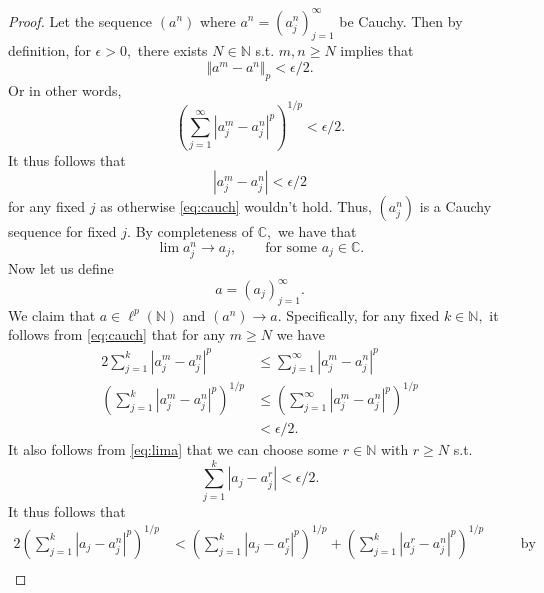 \documentclass[10pt]{article}
\begin{document}
\begin{proof}
    Let the sequence $(a^n)$ where $a^n = (a_j^n)_{j=1}^\infty$ be Cauchy. Then by definition, for $\epsilon > 0,$ there exists $N\in\mathbb{N}$ s.t. $m,n\ge N$ implies that
    \begin{equation*}
        \Vert a^m - a^n \Vert_p < \epsilon/2.
    \end{equation*}
    Or in other words,
    \begin{equation} \label{eq:cauch}
        \left (\sum_{j=1}^{\infty} |a_j^m - a_j^n|^p \right)^{1/p} < \epsilon/2.
    \end{equation}
    It thus follows that
    \begin{equation*}
        |a_j^m-a^n_j | < \epsilon/2
    \end{equation*}
    for any fixed $j$ as otherwise \eqref{eq:cauch} wouldn't hold. Thus, $(a_j^n)$ is a Cauchy sequence for fixed $j.$ By completeness of $\mathbb{C},$ we have that
    \begin{equation} \label{eq:lima}
        \lim a_j^n \to a_j, \qquad\text{for some } a_j\in\mathbb{C}.
    \end{equation}
    Now let us define
    \[a = (a_j)_{j=1}^\infty.\]
    We claim that $a \in \ell^p(\mathbb{N})$ and $(a^n)\to a.$ Specifically, for any fixed $k\in\mathbb{N},$ it follows from \eqref{eq:cauch} that for any $m\ge N$ we have
    \begin{alignat}{2}
        \sum_{j=1}^{k} |a_j^m - a_j^n|^p &\le \sum_{j=1}^{\infty} |a_j^m - a_j^n|^p\nonumber\\
        \left (\sum_{j=1}^{k} |a_j^m - a_j^n|^p \right)^{1/p} &\le  \left (\sum_{j=1}^{\infty} |a_j^m - a_j^n|^p \right)^{1/p}\nonumber\\
        &< \epsilon/2. \label{eq:e1}
    \end{alignat}
    It also follows from \eqref{eq:lima} that we can choose some $r \in\mathbb{N}$ with $r \ge N$ s.t.
    \begin{equation} \label{eq:e2}
        \sum_{j=1}^{k}|a_j - a^r_j| < \epsilon/2.
    \end{equation}
    It thus follows that
    \begin{alignat*}{2}
        \left ( \sum_{j=1}^{k} |a_j - a_j^n|^p \right )^{1/p} &<  \left ( \sum_{j=1}^{k} |a_j - a_j^r|^p \right )^{1/p} +  \left ( \sum_{j=1}^{k} |a_j^r - a_j^n|^p \right )^{1/p} \quad&& \text{by triang. ineq.}\\

\end{alignat*}
\end{proof}
\end{document}
